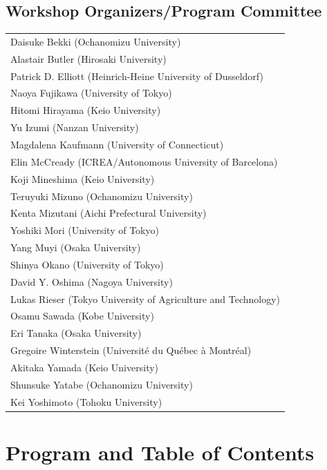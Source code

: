 \documentclass[12pt]{ltjarticle}
\begin{document}
\subsection*{Workshop Organizers/Program Committee}
\begin{flushleft}
\begin{tabular}{l}
Daisuke Bekki (Ochanomizu University) \\
Alastair Butler (Hirosaki University) \\
Patrick D. Elliott (Heinrich-Heine University of Dusseldorf) \\
Naoya Fujikawa (University of Tokyo) \\
Hitomi Hirayama (Keio University) \\
Yu Izumi (Nanzan University) \\
Magdalena Kaufmann (University of Connecticut) \\
Elin McCready (ICREA/Autonomous University of Barcelona) \\
Koji Mineshima (Keio University) \\
Teruyuki Mizuno (Ochanomizu University) \\
Kenta Mizutani (Aichi Prefectural University) \\
Yoshiki Mori (University of Tokyo) \\
Yang Muyi (Osaka University) \\
Shinya Okano (University of Tokyo) \\
David Y. Oshima (Nagoya University) \\
Lukas Rieser (Tokyo University of Agriculture and Technology) \\
Osamu Sawada (Kobe University) \\
Eri Tanaka (Osaka University) \\
Gregoire Winterstein (Université du Québec à Montréal) \\
Akitaka Yamada (Keio University) \\
Shunsuke Yatabe (Ochanomizu University) \\
Kei Yoshimoto (Tohoku University) \\

\end{tabular}
\end{flushleft}
\newpage
  
\section*{Program and Table of Contents}
\end{document}
